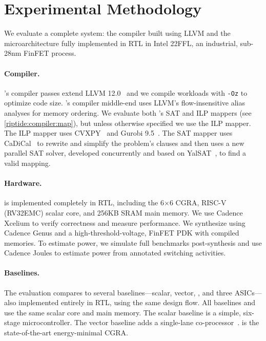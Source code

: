 \section{Experimental Methodology}
\label{riptide:method}

We evaluate a complete \riptide system: the compiler built using LLVM and the
microarchitecture fully implemented in RTL in Intel 22FFL,
an industrial, sub-28nm FinFET process.

\paragraph{Compiler.}
\riptide's compiler passes extend LLVM 12.0~\cite{llvm} and we compile workloads with
\texttt{-Oz} to optimize code size.  
% 
\riptide's compiler middle-end uses LLVM's
flow-insensitive alias analyses for memory ordering.
%
We evaluate both \riptide's SAT and ILP mappers (see \autoref{riptide:compiler:map}), but unless otherwise specified we use the ILP mapper.
% 
The ILP mapper uses CVXPY~\cite{cvxpy} and Gurobi 9.5~\cite{gurobi}.
%
The SAT mapper uses CaDiCal~\cite{cadical} to rewrite and simplify the problem's clauses and then uses a new parallel SAT solver, developed concurrently and based on YalSAT~\cite{yalsat}, to find a valid mapping.

\paragraph{Hardware.}
\label{method:hardware}
\riptide is implemented completely in RTL, including the 6$\times$6 CGRA, RISC-V
(RV32EMC) scalar core, and 256KB
SRAM main memory. 
% 
We use Cadence Xcelium to verify correctness and measure
performance.
% 
We synthesize \riptide using Cadence Genus and a
high-threshold-voltage, FinFET PDK with compiled memories.
% 
To estimate power, we simulate full benchmarks post-synthesis and use Cadence
Joules to estimate power from annotated switching activities.

\paragraph{Baselines.}
The evaluation compares to several baselines---scalar, vector, \snafu, and
three ASICs---also implemented entirely in RTL, using the same design
flow.
% 
All baselines and \riptide use the same scalar core and main memory.
% 
The scalar baseline is a simple, six-stage microcontroller.
% 
The vector baseline adds a single-lane co-processor~\cite{manic}.
% 
\snafu is the state-of-the-art energy-minimal CGRA.

